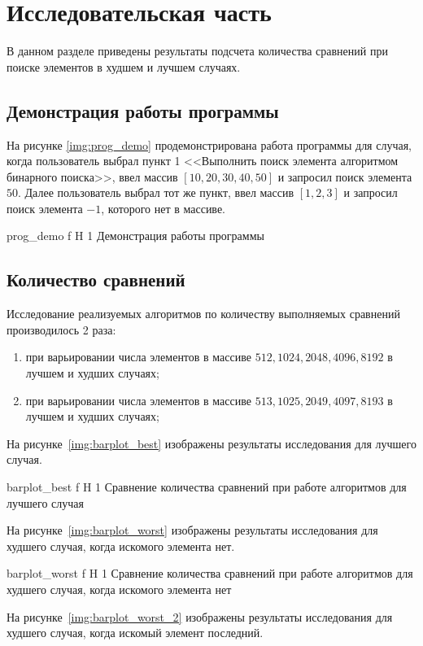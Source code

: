 \chapter{Исследовательская часть}

В данном разделе приведены результаты подсчета количества сравнений при поиске элементов в худшем и лучшем случаях.

\section{Демонстрация работы программы}

На рисунке \ref{img:prog_demo} продемонстрирована работа программы для случая, когда пользователь выбрал пункт 1 <<Выполнить поиск элемента алгоритмом бинарного поиска>>, ввел массив $[10, 20, 30, 40, 50]$ и запросил поиск элемента $50$.
Далее пользователь выбрал тот же пункт, ввел массив $[1, 2, 3]$ и запросил поиск элемента $-1$, которого нет в массиве.

	{prog_demo}
	{f}
	{H}
	{1\textwidth}
	{Демонстрация работы программы}

\section{Количество сравнений}

Исследование реализуемых алгоритмов по количеству выполняемых сравнений производилось 2 раза:
\begin{enumerate}
	\item при варьировании числа элементов в массиве $512, 1024, 2048, 4096, 8192$ в лучшем и худших случаях;
	\item при варьировании числа элементов в массиве $513, 1025, 2049, 4097, 8193$ в лучшем и худших случаях;
\end{enumerate}

На рисунке~\ref{img:barplot_best} изображены результаты исследования для лучшего случая.

	{barplot_best}
	{f}
	{H}
	{1\textwidth}
	{Сравнение количества сравнений при работе алгоритмов для лучшего случая}
	
На рисунке~\ref{img:barplot_worst} изображены результаты исследования для худшего случая, когда искомого элемента нет.

	{barplot_worst}
	{f}
	{H}
	{1\textwidth}
	{Сравнение количества сравнений при работе алгоритмов для худшего случая, когда искомого элемента нет}
	
На рисунке~\ref{img:barplot_worst_2} изображены результаты исследования для худшего случая, когда искомый элемент последний.

